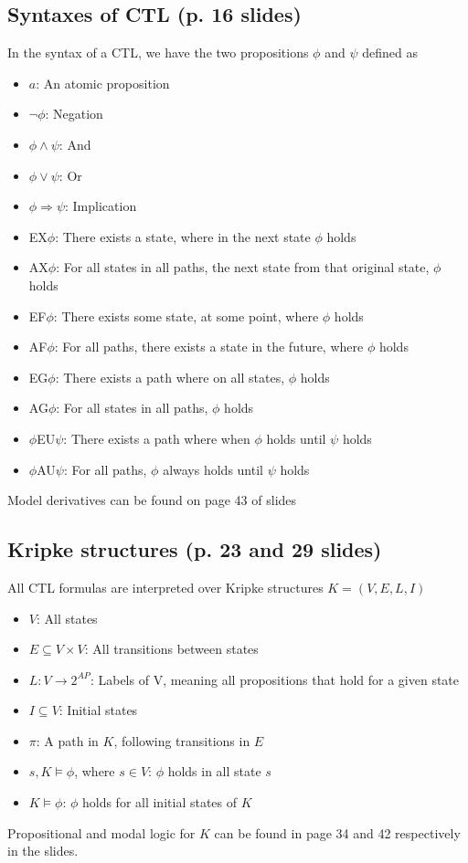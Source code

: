 \documentclass{article}
\begin{document}
		\subsection{Syntaxes of CTL (p. 16 slides)}
			In the syntax of a CTL, we have the two propositions $\phi$ and $\psi$ defined as
			\begin{itemize}
				\item $a$: An atomic proposition
				\item $\neg \phi$: Negation
				\item $\phi\wedge\psi$: And
				\item $\phi\vee\psi$: Or
				\item $\phi\Rightarrow\psi$: Implication
				\item EX$\phi$: There exists a state, where in the next state $\phi$ holds
				\item AX$\phi$: For all states in all paths, the next state from that original state, $\phi$ holds
				\item EF$\phi$: There exists some state, at some point, where $\phi$ holds
				\item AF$\phi$: For all paths, there exists a state in the future, where $\phi$ holds
				\item EG$\phi$: There exists a path where on all states, $\phi$ holds
				\item AG$\phi$: For all states in all paths, $\phi$ holds
				\item $\phi$EU$\psi$: There exists a path where when $\phi$ holds until $\psi$ holds
				\item $\phi$AU$\psi$: For all paths, $\phi$ always holds until $\psi$ holds
			\end{itemize}

			Model derivatives can be found on page 43 of slides

		\subsection{Kripke structures (p. 23 and 29 slides)}
			All CTL formulas are interpreted over Kripke structures $K=(V,E,L,I)$
			\begin{itemize}
				\item $V$: All states
				\item $E\subseteq V\times V$: All transitions between states
				\item $L: V\rightarrow 2^{AP}$: Labels of V, meaning all propositions that hold for a given state
				\item $I\subseteq V$: Initial states
				\item $\pi$: A path in $K$, following transitions in $E$
				\item $s,K\models\phi$, where $s\in V$: $\phi$ holds in all state $s$
				\item $K\models\phi$: $\phi$ holds for all initial states of $K$
			\end{itemize}
			Propositional and modal logic for $K$ can be found in page 34 and 42 respectively in the slides.
	
\end{document}

